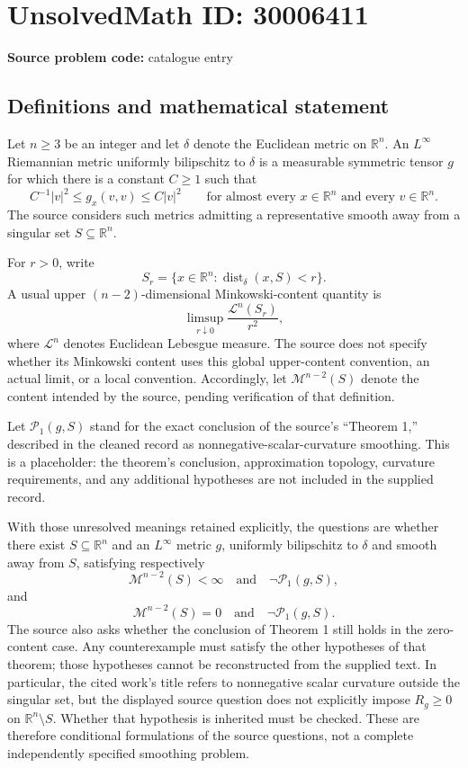 \documentclass[11pt]{article}
\newcommand{\R}{\mathbb{R}}
\begin{document}
\section*{UnsolvedMath ID: 30006411}
\textbf{Source problem code:} catalogue entry
\subsection{Definitions and mathematical statement}
Let \(n\geq 3\) be an integer and let \(\delta\) denote the Euclidean metric on \(\R^n\). An \(L^\infty\) Riemannian metric uniformly bilipschitz to \(\delta\) is a measurable symmetric tensor \(g\) for which there is a constant \(C\geq 1\) such that
\[
 C^{-1}|v|^2\leq g_x(v,v)\leq C|v|^2
 \qquad\text{for almost every }x\in\R^n\text{ and every }v\in\R^n.
\]
The source considers such metrics admitting a representative smooth away from a singular set \(S\subseteq\R^n\).

For \(r>0\), write
\[
 S_r=\{x\in\R^n:\operatorname{dist}_{\delta}(x,S)<r\}.
\]
A usual upper \((n-2)\)-dimensional Minkowski-content quantity is
\[
 \limsup_{r\downarrow0}\frac{\mathcal L^n(S_r)}{r^2},
\]
where \(\mathcal L^n\) denotes Euclidean Lebesgue measure. The source does not specify whether its Minkowski content uses this global upper-content convention, an actual limit, or a local convention. Accordingly, let \(\mathcal M^{n-2}(S)\) denote the content intended by the source, pending verification of that definition.

Let \(\mathcal P_1(g,S)\) stand for the exact conclusion of the source's ``Theorem 1,'' described in the cleaned record as nonnegative-scalar-curvature smoothing. This is a placeholder: the theorem's conclusion, approximation topology, curvature requirements, and any additional hypotheses are not included in the supplied record.

With those unresolved meanings retained explicitly, the questions are whether there exist \(S\subseteq\R^n\) and an \(L^\infty\) metric \(g\), uniformly bilipschitz to \(\delta\) and smooth away from \(S\), satisfying respectively
\[
 \mathcal M^{n-2}(S)<\infty
 \quad\text{and}\quad \neg\mathcal P_1(g,S),
\]
and
\[
 \mathcal M^{n-2}(S)=0
 \quad\text{and}\quad \neg\mathcal P_1(g,S).
\]
The source also asks whether the conclusion of Theorem 1 still holds in the zero-content case. Any counterexample must satisfy the other hypotheses of that theorem; those hypotheses cannot be reconstructed from the supplied text. In particular, the cited work's title refers to nonnegative scalar curvature outside the singular set, but the displayed source question does not explicitly impose \(R_g\geq0\) on \(\R^n\setminus S\). Whether that hypothesis is inherited must be checked. These are therefore conditional formulations of the source questions, not a complete independently specified smoothing problem.
\end{document}
